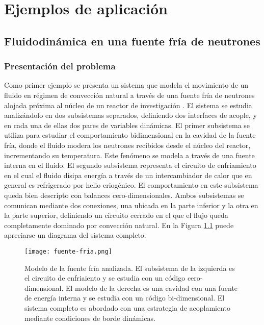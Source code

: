 \chapter{Ejemplos de aplicación}
\label{chap3}

\section{Fluidodinámica en una fuente fría de neutrones}
\label{3:ff}

\subsection*{Presentación del problema}
Como primer ejemplo se presenta un sistema que modela el movimiento de un fluido en régimen de convección natural a través de
una fuente fría de neutrones alojada próxima al núcleo de un reactor de investigación \cite{fuente-fria}.
El sistema se estudia analizándolo en dos subsistemas separados,
definiendo dos interfaces de acople,
y en cada una de ellas dos pares de variables dinámicas.
El primer subsistema se utiliza para estudiar el comportamiento bidimensional en la cavidad de la fuente fría,
donde el fluido modera los neutrones recibidos desde el núcleo del reactor,
incrementando su temperatura.
Este fenómeno se modela a través de una fuente interna en el fluido.
El segundo subsistema representa el circuito de enfriamiento en el cual el fluido disipa energía a través de un intercambiador de calor que en general es refrigerado por helio criogénico.
El comportamiento en este subsistema queda bien descripto con balances cero-dimensionales.
Ambos subsistemas se comunican mediante dos conexiones, una ubicada en la parte inferior y la otra en la parte superior,
definiendo un circuito cerrado en el que el flujo queda completamente dominado por convección natural.
En la Figura \ref{esquemaFuenteFria} puede apreciarse un diagrama del sistema completo.

\begin{figure}[ht]
\centering{}\texttt{[image: fuente-fria.png]}
\caption[Modelo de la fuente fría compuesto por un subsistema cero-dimensional y otro subsistema bi-dimensional.]
{Modelo de la fuente fría analizada. 
El subsistema de la izquierda es el circuito de enfriaiento y se estudia con un código cero-dimensional.
El modelo de la derecha es una cavidad con una fuente de energía interna y se estudia con un código bi-dimensional.
El sistema completo es abordado con una estrategia de acoplamiento mediante condiciones de borde dinámicas.}
\label{esquemaFuenteFria}
\end{figure}


